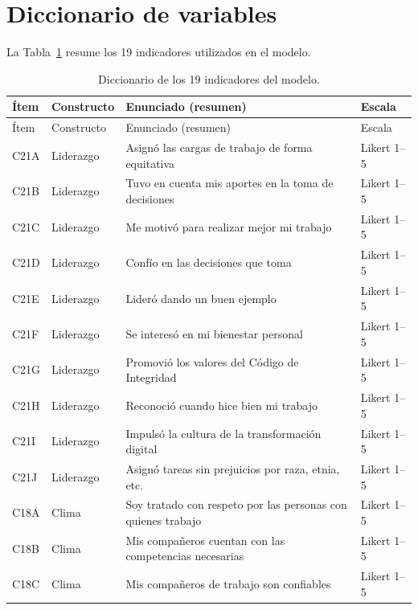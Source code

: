 \documentclass[11pt,a4paper]{article}
\begin{document}



\newpage
\appendix

\section{Diccionario de variables}\label{ap:dict}

La Tabla~\ref{tab:dict} resume los 19 indicadores utilizados en el modelo.

\begin{longtable}{@{}llp{8.2cm}l@{}}
\caption{Diccionario de los 19 indicadores del modelo.}\label{tab:dict}\\
\toprule
Ítem & Constructo & Enunciado (resumen) & Escala \\
\midrule
\endfirsthead
\toprule
Ítem & Constructo & Enunciado (resumen) & Escala \\
\midrule
\endhead
\bottomrule
\endfoot
C21A & Liderazgo & Asignó las cargas de trabajo de forma equitativa & Likert 1--5 \\
C21B & Liderazgo & Tuvo en cuenta mis aportes en la toma de decisiones & Likert 1--5 \\
C21C & Liderazgo & Me motivó para realizar mejor mi trabajo & Likert 1--5 \\
C21D & Liderazgo & Confío en las decisiones que toma & Likert 1--5 \\
C21E & Liderazgo & Lideró dando un buen ejemplo & Likert 1--5 \\
C21F & Liderazgo & Se interesó en mi bienestar personal & Likert 1--5 \\
C21G & Liderazgo & Promovió los valores del Código de Integridad & Likert 1--5 \\
C21H & Liderazgo & Reconoció cuando hice bien mi trabajo & Likert 1--5 \\
C21I & Liderazgo & Impulsó la cultura de la transformación digital & Likert 1--5 \\
C21J & Liderazgo & Asignó tareas sin prejuicios por raza, etnia, etc. & Likert 1--5 \\
C18A & Clima & Soy tratado con respeto por las personas con quienes trabajo & Likert 1--5 \\
C18B & Clima & Mis compañeros cuentan con las competencias necesarias & Likert 1--5 \\
C18C & Clima & Mis compañeros de trabajo son confiables & Likert 1--5 \\

\end{longtable}
\end{document}
